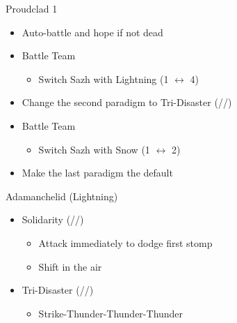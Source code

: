 \begin{paracol}{2}
\begin{battle}{Proudclad 1}
\begin{itemize}
\begin{itemize}
        \item Auto-battle and hope if not dead
    \end{itemize}
\end{itemize}
\end{battle}
\switchcolumn*
\begin{menu}
		      \begin{itemize}
			      \paradigm
			      \begin{itemize}
				      \item Battle Team
				            \begin{itemize}
					            \item Switch Sazh with Lightning (1 $\leftrightarrow$ 4)
				            \end{itemize}
				      \item Change the second paradigm to Tri-Disaster (\rav/\rav/\rav)
			      \end{itemize}
		      \end{itemize}
\end{menu}
\switchcolumn
\begin{menu}
\begin{itemize}
    \paradigm
    \begin{itemize}
        \item Battle Team
        \begin{itemize}
            \item Switch Sazh with Snow (1 $\leftrightarrow$ 2)
        \end{itemize}
        \item Make the last paradigm the default
    \end{itemize}
\end{itemize}
\end{menu}
\switchcolumn*
\begin{battle}{Adamanchelid (Lightning)}
	\renewcommand{\first}{[1] Solidarity (\com/\sen/\med)}
	\renewcommand{\second}{[2] Tri-Disaster (\rav/\rav/\rav)}
	\begin{itemize}
		\item \first
		      \begin{itemize}
			      \item Attack immediately to dodge first stomp
			      \item Shift in the air
		      \end{itemize}
		\item \second
		      \begin{itemize}
			      \item Strike-Thunder-Thunder-Thunder

\end{itemize}
\end{itemize}
\end{battle}
\end{paracol}
